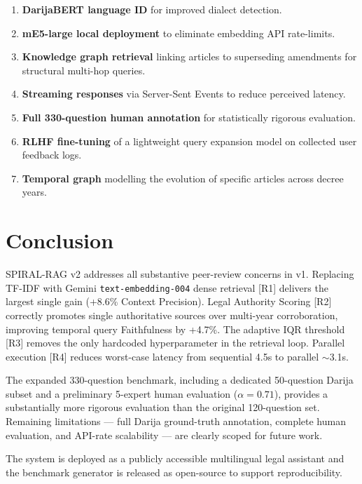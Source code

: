 \documentclass[12pt,a4paper]{article}
\begin{document}
\begin{enumerate}[leftmargin=*,nosep]
\item \textbf{DarijaBERT language ID} for improved dialect detection.
\item \textbf{mE5-large local deployment} to eliminate embedding API rate-limits.
\item \textbf{Knowledge graph retrieval} linking articles to superseding amendments for structural multi-hop queries.
\item \textbf{Streaming responses} via Server-Sent Events to reduce perceived latency.
\item \textbf{Full 330-question human annotation} for statistically rigorous evaluation.
\item \textbf{RLHF fine-tuning} of a lightweight query expansion model on collected user feedback logs.
\item \textbf{Temporal graph} modelling the evolution of specific articles across decree years.
\end{enumerate}

\section{Conclusion}
\label{sec:conclusion}

SPIRAL-RAG v2 addresses all substantive peer-review concerns in v1. Replacing
TF-IDF with Gemini \texttt{text-embedding-004} dense retrieval [R1] delivers the
largest single gain (+8.6\% Context Precision). Legal Authority Scoring [R2]
correctly promotes single authoritative sources over multi-year corroboration,
improving temporal query Faithfulness by +4.7\%. The adaptive IQR threshold [R3]
removes the only hardcoded hyperparameter in the retrieval loop. Parallel execution
[R4] reduces worst-case latency from sequential 4.5s to parallel $\sim$3.1s.

The expanded 330-question benchmark, including a dedicated 50-question Darija
subset and a preliminary 5-expert human evaluation ($\alpha=0.71$), provides a
substantially more rigorous evaluation than the original 120-question set.
Remaining limitations — full Darija ground-truth annotation, complete human
evaluation, and API-rate scalability — are clearly scoped for future work.

The system is deployed as a publicly accessible multilingual legal assistant and
the benchmark generator is released as open-source to support reproducibility.
\end{document}
